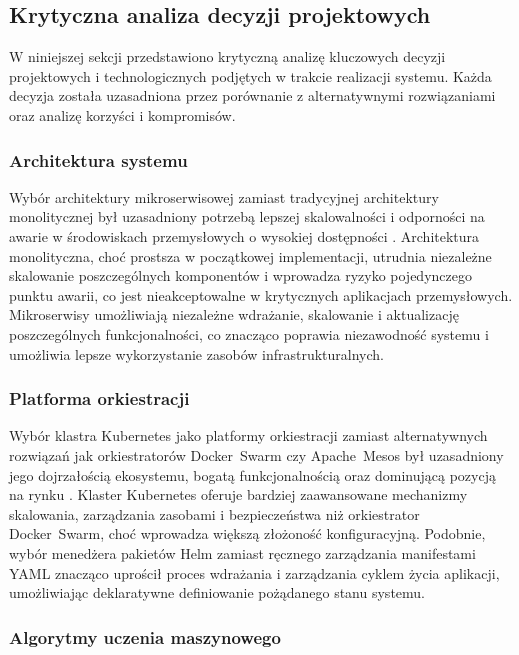 \subsection{Krytyczna analiza decyzji projektowych}

W niniejszej sekcji przedstawiono krytyczną analizę kluczowych decyzji projektowych i technologicznych podjętych w trakcie realizacji systemu. Każda decyzja została uzasadniona przez porównanie z alternatywnymi rozwiązaniami oraz analizę korzyści i kompromisów.

\subsubsection{Architektura systemu}

Wybór architektury mikroserwisowej zamiast tradycyjnej architektury monolitycznej był uzasadniony potrzebą lepszej skalowalności i odporności na awarie w środowiskach przemysłowych o wysokiej dostępności \cite{microservice_benefits}. Architektura monolityczna, choć prostsza w początkowej implementacji, utrudnia niezależne skalowanie poszczególnych komponentów i wprowadza ryzyko pojedynczego punktu awarii, co jest nieakceptowalne w krytycznych aplikacjach przemysłowych. Mikroserwisy umożliwiają niezależne wdrażanie, skalowanie i aktualizację poszczególnych funkcjonalności, co znacząco poprawia niezawodność systemu i umożliwia lepsze wykorzystanie zasobów infrastrukturalnych.

\subsubsection{Platforma orkiestracji}

Wybór klastra Kubernetes jako platformy orkiestracji zamiast alternatywnych rozwiązań jak orkiestratorów \mbox{Docker Swarm} czy \mbox{Apache Mesos} był uzasadniony jego dojrzałością ekosystemu, bogatą funkcjonalnością oraz dominującą pozycją na rynku \cite{kubernetes_benefits}. Klaster Kubernetes oferuje bardziej zaawansowane mechanizmy skalowania, zarządzania zasobami i bezpieczeństwa niż orkiestrator \mbox{Docker Swarm}, choć wprowadza większą złożoność konfiguracyjną. Podobnie, wybór menedżera pakietów \mbox{Helm} \cite{helm_docs} zamiast ręcznego zarządzania manifestami YAML \cite{yaml_spec} znacząco uprościł proces wdrażania i zarządzania cyklem życia aplikacji, umożliwiając deklaratywne definiowanie pożądanego stanu systemu.

\subsubsection{Algorytmy uczenia maszynowego}

